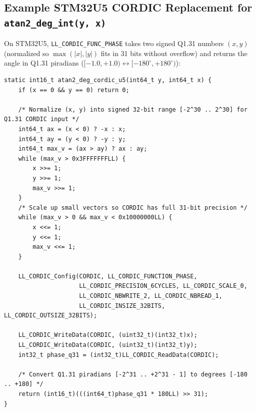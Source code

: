 \documentclass[11pt,a4paper]{article}
\begin{document}
\subsection{Example STM32U5 CORDIC Replacement for \texttt{atan2\_deg\_int(y, x)}}

On STM32U5, \texttt{LL\_CORDIC\_FUNC\_PHASE} takes two signed Q1.31 numbers $(x, y)$ (normalized so $\max(|x|, |y|)$ fits in 31 bits without overflow) and returns the angle in Q1.31 piradians ($[-1.0, +1.0) \leftrightarrow [-180^\circ, +180^\circ)$):

\begin{lstlisting}[caption={Drop-in STM32U5 CORDIC replacement for \texttt{atan2\_deg\_int()}}]
static int16_t atan2_deg_cordic_u5(int64_t y, int64_t x) {
    if (x == 0 && y == 0) return 0;

    /* Normalize (x, y) into signed 32-bit range [-2^30 .. 2^30] for Q1.31 CORDIC input */
    int64_t ax = (x < 0) ? -x : x;
    int64_t ay = (y < 0) ? -y : y;
    int64_t max_v = (ax > ay) ? ax : ay;
    while (max_v > 0x3FFFFFFFLL) {
        x >>= 1;
        y >>= 1;
        max_v >>= 1;
    }
    /* Scale up small vectors so CORDIC has full 31-bit precision */
    while (max_v > 0 && max_v < 0x10000000LL) {
        x <<= 1;
        y <<= 1;
        max_v <<= 1;
    }

    LL_CORDIC_Config(CORDIC, LL_CORDIC_FUNCTION_PHASE,
                     LL_CORDIC_PRECISION_6CYCLES, LL_CORDIC_SCALE_0,
                     LL_CORDIC_NBWRITE_2, LL_CORDIC_NBREAD_1,
                     LL_CORDIC_INSIZE_32BITS, LL_CORDIC_OUTSIZE_32BITS);

    LL_CORDIC_WriteData(CORDIC, (uint32_t)(int32_t)x);
    LL_CORDIC_WriteData(CORDIC, (uint32_t)(int32_t)y);
    int32_t phase_q31 = (int32_t)LL_CORDIC_ReadData(CORDIC);

    /* Convert Q1.31 piradians [-2^31 .. +2^31 - 1] to degrees [-180 .. +180] */
    return (int16_t)(((int64_t)phase_q31 * 180LL) >> 31);
}
\end{lstlisting}
\end{document}
